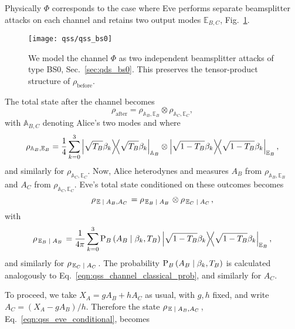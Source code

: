 Physically $\Phi$ corresponds to the case where Eve performs separate beamsplitter attacks on each channel and retains two output modes $\mathbb{E}_{B, C}$, Fig.~\ref{fig:qss_bs0_attack}.

\begin{figure}[htp]
\captionsetup{width=0.8\linewidth}
\centering
\texttt{[image: qss/qss\_bs0]}
\caption{\label{fig:qss_bs0_attack} We model the channel $\Phi$ as two independent beamsplitter attacks of type BS$0$, Sec.~\ref{sec:qds_bs0}. This preserves the tensor-product structure of $\rho_{\text{before}}$.}
\end{figure}


The total state after the channel becomes
\begin{equation}
\rho_{\text{after}} = \rho_{\mathbb{A}_B, \mathbb{E}_B} \otimes \rho_{\mathbb{A}_C, \mathbb{E}_C},
\end{equation}
with $\mathbb{A}_{B, C}$ denoting Alice's two modes and where
\begin{equation}
\rho_{\mathbb{A}_B, \mathbb{E}_B} = \frac{1}{4} \sum_{k=0}^3 \dyad{\sqrt{T_B} \beta_k}_{\mathbb{A}_B} \otimes \dyad{\sqrt{1-T_B} \beta_k}_{\mathbb{E}_B},
\end{equation}
and similarly for $\rho_{\mathbb{A}_C, \mathbb{E}_C}$. Now, Alice heterodynes and measures $A_B$ from $\rho_{\mathbb{A}_B, \mathbb{E}_B}$ and $A_C$ from $\rho_{\mathbb{A}_C, \mathbb{E}_C}$. Eve's total state conditioned on these outcomes becomes 
\begin{equation}\label{eqn:qss_eve_conditional}
\rho_{\left.\mathbb{E} \; \middle| \; A_B, A_C\right.} = \rho_{\left.\mathbb{E}_B \; \middle| \; A_B\right.} \otimes \rho_{\left. \mathbb{E}_C \; \middle| \; A_C\right.},
\end{equation}
with
\begin{equation}
\rho_{\left.\mathbb{E}_B \given A_B\right.} = \frac{1}{4 \pi} \sum_{k=0}^3 \text{P}_B\left(A_B \given \beta_k, T_B\right) \dyad{\sqrt{1-T_B} \beta_k}_{\mathbb{E}_B},
\end{equation}
and similarly for $\rho_{\left.\mathbb{E}_C \; \middle| \; A_C\right.}$. The probability $\text{P}_B\left(A_B \; \middle| \; \beta_k, T_B\right)$ is calculated analogously to Eq.~\ref{eqn:qss_channel_classical_prob}, and similarly for $A_C$.

To proceed, we take $X_A = g A_B + h A_C$ as usual, with $g, h$ fixed, and write $A_C = \left(X_A - g A_B\right)/h$. Therefore the state $\rho_{\left.\mathbb{E} \; \middle| \; A_B, A_C\right.}$, Eq.~\ref{eqn:qss_eve_conditional}, becomes

